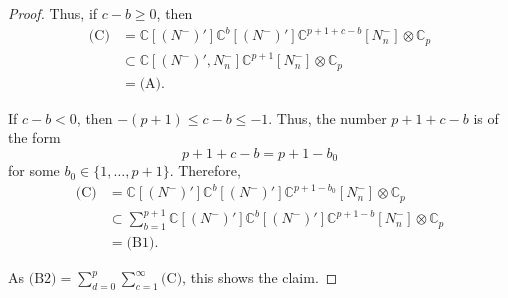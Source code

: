 \documentclass[10pt,a4paper]{amsart}
\newcommand{\C}{\mathbb{C}}
\newcommand{\Nn}{N_n^-}
\newcommand{\Np}{(N^-)'}
\begin{document}
\begin{proof}
\noindent
Thus, if $c-b\geq 0$, then
\begin{align*}
\text{(C)}
&=\C[\Np]\C^{b}[\Np]\C^{p+1+c-b}[\Nn]\otimes \C_p\\
&\subset\C[\Np,\Nn]\C^{p+1}[\Nn]\otimes \C_p\\
&=\text{(A)}.
\end{align*}

\noindent
If $c-b < 0$, then $-(p+1) \leq c-b \leq -1$. Thus,
the number $p+1+c-b$ is of the form
\begin{equation*}
p+1+c-b = p+1-b_0
\end{equation*}
for some $b_0 \in \{1,\ldots, p+1\}$. Therefore,
\begin{align*}
\text{(C)}
&=\C[\Np]\C^{b}[\Np]\C^{p+1-b_0}[\Nn]\otimes \C_p\\
&\subset 
\sum_{b=1}^{p+1}\C[\Np]\C^{b}[\Np]\C^{p+1-b}[\Nn]\otimes \C_p\\
&=\text{(B1)}.
\end{align*}

\noindent
As $\text{(B2)} = \sum_{d=0}^p\sum_{c=1}^\infty \text{(C)}$, this shows the claim.
\end{proof}
\end{document}
